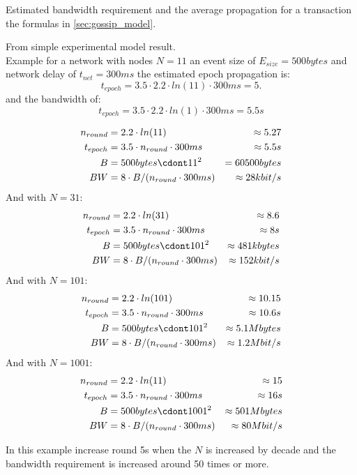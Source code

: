 Estimated bandwidth requirement and the average propagation for a transaction the formulas in \cref{sec:gossip_model}.
 
From simple experimental model result.\\

Example for a network with nodes $N=11$ an event size of $E_{size}=500bytes$ and network delay of $t_{net}=300ms$ the estimated epoch propagation is:\\
\begin{equation*}
t_{epoch}=3.5 \cdot 2.2 \cdot ln(11) \cdot 300ms = 5.
\end{equation*}
and the bandwidth of:
\begin{equation*}
t_{epoch}=3.5 \cdot 2.2 \cdot ln(1) \cdot 300ms = 5.5s
\end{equation*}

\begin{align*}
n_{round} &= 2.2 \cdot ln(11) &\approx  5.27\\
t_{epoch} &= 3.5 \cdot n_{round} \cdot 300ms & \approx 5.5s \\
B &= 500bytes \cdont 11^2 &= 60500bytes \\
BW &= 8 \cdot B / (n_{round}\cdot 300ms) &\approx 28kbit/s \\
\end{align*}
And with $N=31$:
\begin{align*}
n_{round} &= 2.2 \cdot ln(31) & \approx  8.6\\
t_{epoch} &= 3.5 \cdot n_{round} \cdot 300ms & \approx 8s \\
B &= 500bytes \cdont 101^2 & \approx 481kbytes \\
BW &= 8 \cdot B / (n_{round}\cdot 300ms) &\approx 152kbit/s \\
\end{align*}
And with $N=101$:
\begin{align*}
n_{round} &= 2.2 \cdot ln(101) & \approx  10.15\\
t_{epoch} &= 3.5 \cdot n_{round} \cdot 300ms & \approx 10.6s \\
B &= 500bytes \cdont 101^2 & \approx 5.1Mbytes \\
BW &= 8 \cdot B / (n_{round}\cdot 300ms) &\approx 1.2Mbit/s \\
\end{align*}
And with $N=1001$:
\begin{align*}
n_{round} &= 2.2 \cdot ln(11) & \approx  15\\
t_{epoch} &= 3.5 \cdot n_{round} \cdot 300ms & \approx 16s \\
B &= 500bytes \cdont 1001^2 &\approx 501Mbytes \\
BW &= 8 \cdot B / (n_{round}\cdot 300ms) &\approx 80Mbit/s \\
\end{align*}

In this example increase round 5s when the $N$ is increased by decade and the bandwidth requirement is increased around 50 times or more.
